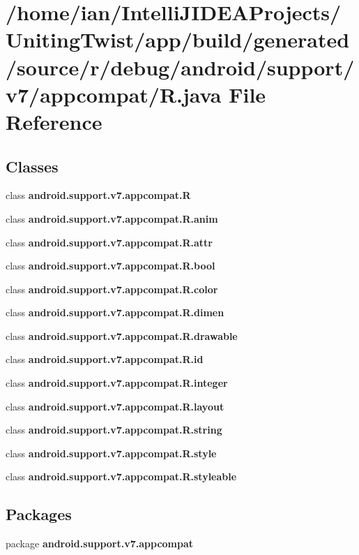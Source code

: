 \section{/home/ian/\+Intelli\+J\+I\+D\+E\+A\+Projects/\+Uniting\+Twist/app/build/generated/source/r/debug/android/support/v7/appcompat/R.java File Reference}
\label{android_2support_2v7_2appcompat_2_r_8java}
\subsection*{Classes}
\begin{DoxyCompactItemize}
\item 
class \textbf{ android.\+support.\+v7.\+appcompat.\+R}
\item 
class {\bfseries android.\+support.\+v7.\+appcompat.\+R.\+anim}
\item 
class {\bfseries android.\+support.\+v7.\+appcompat.\+R.\+attr}
\item 
class {\bfseries android.\+support.\+v7.\+appcompat.\+R.\+bool}
\item 
class {\bfseries android.\+support.\+v7.\+appcompat.\+R.\+color}
\item 
class {\bfseries android.\+support.\+v7.\+appcompat.\+R.\+dimen}
\item 
class {\bfseries android.\+support.\+v7.\+appcompat.\+R.\+drawable}
\item 
class {\bfseries android.\+support.\+v7.\+appcompat.\+R.\+id}
\item 
class {\bfseries android.\+support.\+v7.\+appcompat.\+R.\+integer}
\item 
class {\bfseries android.\+support.\+v7.\+appcompat.\+R.\+layout}
\item 
class {\bfseries android.\+support.\+v7.\+appcompat.\+R.\+string}
\item 
class {\bfseries android.\+support.\+v7.\+appcompat.\+R.\+style}
\item 
class {\bfseries android.\+support.\+v7.\+appcompat.\+R.\+styleable}
\end{DoxyCompactItemize}
\subsection*{Packages}
\begin{DoxyCompactItemize}
\item 
package \textbf{ android.\+support.\+v7.\+appcompat}
\end{DoxyCompactItemize}

